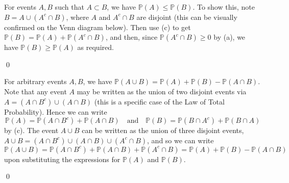 \begin{example}
    For events $A, B$ such that $A \subset B$, we have $\mathbb{P}(A) \leq \mathbb{P}(B)$. To show this, note $B = A \cup (A^c \cap B)$, where $A$ and $A^c \cap B$ are disjoint (this can be visually confirmed on the Venn diagram below). Then use (c) to get $\mathbb{P}(B) = \mathbb{P}(A) + \mathbb{P}(A^c \cap B)$, and then, since $\mathbb{P}(A^c \cap B) \geq 0$ by (a), we have $\mathbb{P}(B) \geq \mathbb{P}(A)$ as required.

\begin{center}
\end{center} \qed
\end{example}

\begin{example}
    For arbitrary events $A, B$, we have $\mathbb{P}(A \cup B) = \mathbb{P}(A) + \mathbb{P}(B) - \mathbb{P}(A \cap B)$. Note that any event $A$ may be written as the union of two disjoint events via $A = (A \cap B^c) \cup (A \cap B)$ (this is a specific case of the Law of Total Probability). Hence we can write
    \[
        \mathbb{P}(A) = \mathbb{P}(A \cap B^c) + \mathbb{P}(A \cap B) \quad \text{and} \quad \mathbb{P}(B) = \mathbb{P}(B \cap A^c) + \mathbb{P}(B \cap A)
    \]
     by (c). The event $A \cup B$ can be written as the union of three disjoint events, $A \cup B = (A \cap B^c) \cup (A \cap B) \cup (A^c \cap B)$, and so we can write
     \[
         \mathbb{P}(A \cup B) = \mathbb{P}(A \cap B^c) + \mathbb{P}(A \cap B) + \mathbb{P}(A^c \cap B) = \mathbb{P}(A) + \mathbb{P}(B) - \mathbb{P}(A \cap B)
     \]
     upon substituting the expressions for $\mathbb{P}(A)$ and $\mathbb{P}(B)$.

\begin{center}
\end{center} \qed
\end{example}

